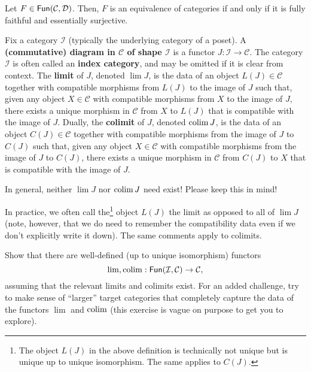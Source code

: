 \documentclass[11pt]{article}
\renewcommand{\C}{\mathcal{C}}
\newcommand{\I}{\mathcal{I}}
\begin{document}
\begin{proposition}
Let $F\in\Fun(\C,\D)$. Then, $F$ is an equivalence of categories if and only if it is fully faithful and essentially surjective.
\end{proposition}

\begin{definition}
Fix a category $\I$ (typically the underlying category of a poset). A \textbf{(commutative) diagram in $\C$ of shape $\I$} is a functor $J: \I\to\C$. The category $\I$ is often called an \textbf{index category}, and may be omitted if it is clear from context. The \textbf{limit} of $J$, denoted $\lim J$, is the data of an object $L(J)\in\C$ together with compatible morphisms from $L(J)$ to the image of $J$ such that, given any object $X\in\C$ with compatible morphisms from $X$ to the image of $J$, there exists a unique morphism in $\C$ from $X$ to $L(J)$ that is compatible with the image of $J$. Dually, the \textbf{colimit} of $J$, denoted $\operatorname{colim} J$, is the data of an object $C(J)\in\C$ together with compatible morphisms from the image of $J$ to $C(J)$ such that, given any object $X\in\C$ with compatible morphisms from the image of $J$ to $C(J)$, there exists a unique morphism in $\C$ from $C(J)$ to $X$ that is compatible with the image of $J$.
\end{definition}

\begin{remark}
In general, neither $\lim J$ nor $\operatorname{colim} J$ need exist! Please keep this in mind!
\end{remark}

In practice, we often call the\footnote{The object $L(J)$ in the above definition is technically not unique but is unique up to unique isomorphism. The same applies to $C(J)$.} object $L(J)$ the limit as opposed to all of $\lim J$ (note, however, that we do need to remember the compatibility data even if we don't explicitly write it down). The same comments apply to colimits.

\begin{exercise}
Show that there are well-defined (up to unique isomorphism) functors 
$$\lim,\colim: \Fun(\I,\C)\to\C,$$
assuming that the relevant limits and colimits exist. For an added challenge, try to make sense of ``larger'' target categories that completely capture the data of the functors $\lim$ and $\operatorname{colim}$ (this exercise is vague on purpose to get you to explore).
\end{exercise}
\end{document}
